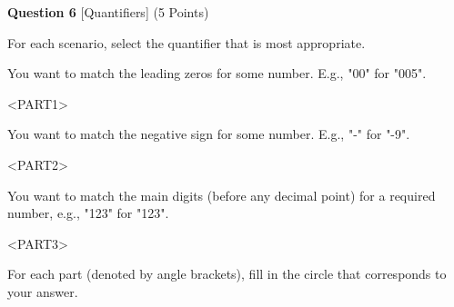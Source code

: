 \documentclass{report}
\begin{document}




\vspace{1.0cm}




\begin{minipage}{\textwidth}
    \noindent
        \textbf{Question 6} [Quantifiers] (5 Points)
    \vspace{0.25cm}

    \noindent
    For each scenario, select the quantifier that is most appropriate.

You want to match the leading zeros for some number. E.g., "00" for "005".~\newline

\textsc{<PART1>}

You want to match the negative sign for some number. E.g., "-" for "-9".~\newline

\textsc{<PART2>}

You want to match the main digits (before any decimal point) for a required number,
e.g., "123" for "123".~\newline

\textsc{<PART3>}

    \vspace{0.25cm}

    For each part (denoted by angle brackets), fill in the circle that corresponds to your answer.

        \vspace{0.25cm}



        \end{minipage}
\end{document}
